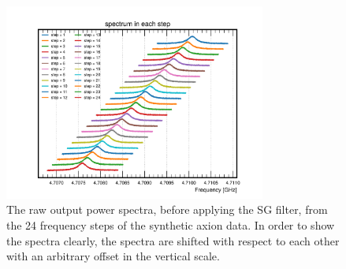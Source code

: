 \begin{figure}[htbp]                                                                                                  
    \centering                                                                                                                       
    \includegraphics[width=8.6cm]{figures/faxion_rawpower_24steps.png}
 \caption{The raw output power spectra, before applying the 
 SG filter, from the 24 frequency steps of the synthetic axion 
data. In order to show the spectra clearly, the spectra are shifted 
with respect to each other with an arbitrary offset in the vertical scale.}                
\label{fig:faxionstep}                                                                                                            
\end{figure}                       


